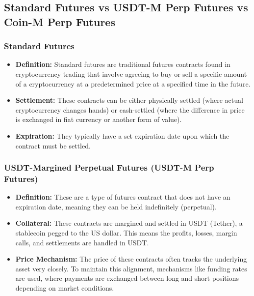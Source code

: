 \documentclass{report}
\begin{document}
    \bigbreak \noindent 
    \subsection{Standard Futures vs USDT-M Perp Futures vs Coin-M Perp Futures}

    \bigbreak \noindent 
    \subsubsection{Standard Futures}
    \bigbreak \noindent 
    \begin{itemize}
        \item \textbf{Definition:} Standard futures are traditional futures contracts found in cryptocurrency trading that involve agreeing to buy or sell a specific amount of a cryptocurrency at a predetermined price at a specified time in the future.
        \item \textbf{Settlement:} These contracts can be either physically settled (where actual cryptocurrency changes hands) or cash-settled (where the difference in price is exchanged in fiat currency or another form of value).
        \item \textbf{Expiration:} They typically have a set expiration date upon which the contract must be settled.
    \end{itemize}

    \bigbreak \noindent 
    \subsubsection{USDT-Margined Perpetual Futures (USDT-M Perp Futures)}
    \bigbreak \noindent 
    \begin{itemize}
        \item \textbf{Definition:} These are a type of futures contract that does not have an expiration date, meaning they can be held indefinitely (perpetual).
        \item \textbf{Collateral:} These contracts are margined and settled in USDT (Tether), a stablecoin pegged to the US dollar. This means the profits, losses, margin calls, and settlements are handled in USDT.
        \item \textbf{Price Mechanism:} The price of these contracts often tracks the underlying asset very closely. To maintain this alignment, mechanisms like funding rates are used, where payments are exchanged between long and short positions depending on market conditions.
    \end{itemize}
\end{document}
